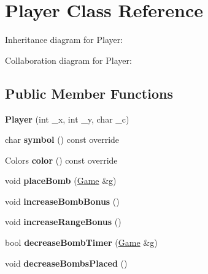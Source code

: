 \hypertarget{class_player}{}\section{Player Class Reference}
\label{class_player}


Inheritance diagram for Player\+:


Collaboration diagram for Player\+:
\subsection*{Public Member Functions}
\begin{DoxyCompactItemize}
\item 
\mbox{\label{class_player_a66be695770f22529a488c5efb1247830}} 
{\bfseries Player} (int \+\_\+x, int \+\_\+y, char \+\_\+c)
\item 
\mbox{\label{class_player_af24722d2394768cdfb180f810ba6f72d}} 
char {\bfseries symbol} () const override
\item 
\mbox{\label{class_player_a3744e27096bff92fe46a03f149d17c82}} 
Colors {\bfseries color} () const override
\item 
\mbox{\label{class_player_a12b04e3f4e4f0147b44f1e6cb806d9ff}} 
void {\bfseries place\+Bomb} (\mbox{\hyperlink{class_game}{Game}} \&g)
\item 
\mbox{\label{class_player_a7a5c6954dc4a8e952ec68f6a15546464}} 
void {\bfseries increase\+Bomb\+Bonus} ()
\item 
\mbox{\label{class_player_a63ef60a60d0ce48458de2f36e6c54c73}} 
void {\bfseries increase\+Range\+Bonus} ()
\item 
\mbox{\label{class_player_afd3c8e413a7c8f5f2adddf4f9e941cef}} 
bool {\bfseries decrease\+Bomb\+Timer} (\mbox{\hyperlink{class_game}{Game}} \&g)
\item 
\mbox{\label{class_player_a5f96f0dc6b50021695c4e02cadb7b93b}} 
void {\bfseries decrease\+Bombs\+Placed} ()
\item 
\mbox{\label{class_player_aff7be2a9adf2a012ee33292ff08934d1}} 

\end{DoxyCompactItemize}
